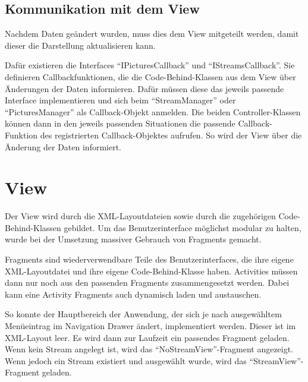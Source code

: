 \subsection{Kommunikation mit dem View}

Nachdem Daten geändert wurden, muss dies dem View mitgeteilt werden, damit dieser die Darstellung aktualisieren kann.

Dafür existieren die Interfaces \enquote{IPicturesCallback} und \enquote{IStreamsCallback}. Sie definieren Callbackfunktionen, die die Code-Behind-Klassen aus dem View über Änderungen der Daten informieren. Dafür müssen diese das jeweils passende Interface implementieren und sich beim \enquote{StreamManager} oder \enquote{PicturesManager} als Callback-Objekt anmelden. Die beiden Controller-Klassen können dann in den jeweils passenden Situationen die passende Callback-Funktion des registrierten Callback-Objektes aufrufen. So wird der View über die Änderung der Daten informiert.

\section{View}

Der View wird durch die XML-Layoutdateien sowie durch die zugehörigen Code-Behind-Klassen gebildet. Um das Benutzerinterface möglichst modular zu halten, wurde bei der Umsetzung massiver Gebrauch von Fragments gemacht.

Fragments sind wiederverwendbare Teile des Benutzerinterfaces, die ihre eigene XML-Layoutdatei und ihre eigene Code-Behind-Klasse haben. Activities müssen dann nur noch aus den passenden Fragments zusammengesetzt werden. Dabei kann eine Activity Fragments auch dynamisch laden und austauschen. 

So konnte der Hauptbereich der Anwendung, der sich je nach ausgewähltem Menüeintrag im Navigation Drawer ändert, implementiert werden. Dieser ist im XML-Layout leer. Es wird dann zur Laufzeit ein passendes Fragment geladen. 
Wenn kein Stream angelegt ist, wird das \enquote{NoStreamView}-Fragment angezeigt. Wenn jedoch ein Stream existiert und ausgewählt wurde, wird das \enquote{StreamView}-Fragment geladen.
